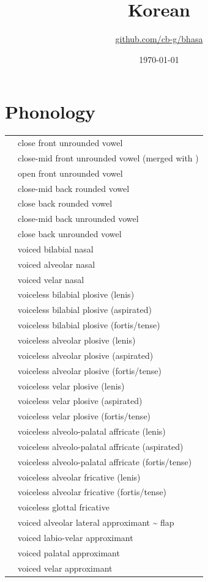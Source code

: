 \documentclass{article}
\title{Korean\\\ipa{[han.gu.g2]}}
\author{\href{https://github.com/cb-g/bhasa}{github.com/cb-g/bhasa}}
\date{\today}
\begin{document}
\pagecolor{custom_bg}\color{custom_fg}
\maketitle\thispagestyle{empty}

\newpage\setcounter{page}{1}\section{Phonology}

\begin{xltabular}{\textwidth}{lL}
   & close front unrounded vowel \\
   & close-mid front unrounded vowel (merged with ) \\
   & open front unrounded vowel \\
   & close-mid back rounded vowel \\
   & close back rounded vowel \\
   & close-mid back unrounded vowel \\
   & close back unrounded vowel \\
   & voiced bilabial nasal \\
   & voiced alveolar nasal \\
   & voiced velar nasal \\
   & voiceless bilabial plosive (lenis) \\
   & voiceless bilabial plosive (aspirated) \\
   & voiceless bilabial plosive (fortis/tense) \\
   & voiceless alveolar plosive (lenis) \\
   & voiceless alveolar plosive (aspirated) \\
   & voiceless alveolar plosive (fortis/tense) \\
   & voiceless velar plosive (lenis) \\
   & voiceless velar plosive (aspirated) \\
   & voiceless velar plosive (fortis/tense) \\
   & voiceless alveolo-palatal affricate (lenis) \\
   & voiceless alveolo-palatal affricate (aspirated) \\
   & voiceless alveolo-palatal affricate (fortis/tense) \\
   & voiceless alveolar fricative (lenis) \\
   & voiceless alveolar fricative (fortis/tense) \\
   & voiceless glottal fricative \\
   & voiced alveolar lateral approximant \textasciitilde{} flap \\
   & voiced labio-velar approximant \\
   & voiced palatal approximant \\
  \ipa{\textturnm} & voiced velar approximant \\
\end{xltabular}
\end{document}
